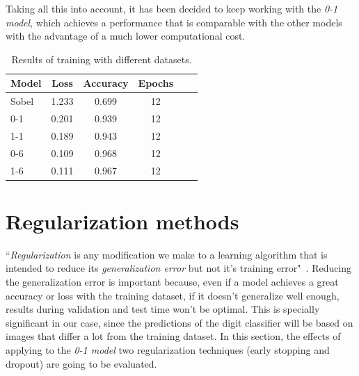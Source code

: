 Taking all this into account, it has been decided to keep working with the \emph{\textit{0-1} model}, which achieves a performance that is comparable with the other models with the advantage of a much lower computational cost.

\begin{table}
	\centering
	\begin{tabular}{l*{4}{c}r}
		\textbf{Model} & \textbf{Loss} & \textbf{Accuracy} & \textbf{Epochs} \\
		\hline
		Sobel & 1.233 & 0.699 & 12 \\
		0-1 & 0.201 & 0.939 & 12 \\
		1-1 & 0.189 & 0.943 & 12 \\
		0-6 & 0.109 & 0.968 & 12 \\
		1-6 & 0.111 & 0.967 & 12 \\
	\end{tabular}
	\caption{Results of training with different datasets.}
	\label{tbl:datasets}
\end{table}

\section{Regularization methods}
``\emph{Regularization} is any modification we make to a learning algorithm that is intended to reduce its \emph{generalization error} but not it's training error"~\cite{Goodfellow-et-al-2016}. Reducing the generalization error is important because, even if a model achieves a great accuracy or loss with the training dataset, if it doesn't generalize well enough, results during validation and test time won't be optimal. This is specially significant in our case, since the predictions of the digit classifier will be based on images that differ a lot from the training dataset. In this section, the effects of applying to the \emph{\textit{0-1} model} two regularization techniques (early stopping and dropout) are going to be evaluated. 

